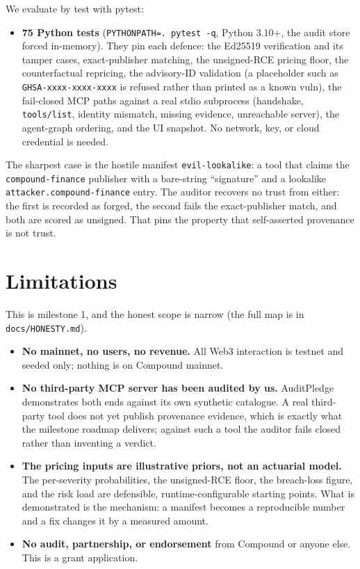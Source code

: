 \documentclass[11pt]{article}
\begin{document}
We evaluate by test with pytest:

\begin{itemize}[leftmargin=1.4em]
\item \textbf{75 Python tests} (\texttt{PYTHONPATH=. pytest -q}, Python 3.10+, the audit store
forced in-memory). They pin each defence: the Ed25519 verification and its tamper cases,
exact-publisher matching, the unsigned-RCE pricing floor, the counterfactual repricing, the
advisory-ID validation (a placeholder such as \texttt{GHSA-xxxx-xxxx-xxxx} is refused rather
than printed as a known vuln), the fail-closed MCP paths against a real stdio subprocess
(handshake, \texttt{tools/list}, identity mismatch, missing evidence, unreachable server), the
agent-graph ordering, and the UI snapshot. No network, key, or cloud credential is needed.
\end{itemize}

The sharpest case is the hostile manifest \texttt{evil-lookalike}: a tool that claims the
\texttt{compound-finance} publisher with a bare-string ``signature'' and a lookalike
\texttt{attacker.compound-finance} entry. The auditor recovers no trust from either: the first
is recorded as forged, the second fails the exact-publisher match, and both are scored as
unsigned. That pins the property that self-asserted provenance is not trust.

\section{Limitations}\label{sec:limits}
This is milestone 1, and the honest scope is narrow (the full map is in
\texttt{docs/HONESTY.md}).
\begin{itemize}[leftmargin=1.4em]
\item \textbf{No mainnet, no users, no revenue.} All Web3 interaction is testnet and seeded
only; nothing is on Compound mainnet.
\item \textbf{No third-party MCP server has been audited by us.} AuditPledge demonstrates both
ends against its own synthetic catalogue. A real third-party tool does not yet publish
provenance evidence, which is exactly what the milestone roadmap delivers; against such a tool
the auditor fails closed rather than inventing a verdict.
\item \textbf{The pricing inputs are illustrative priors, not an actuarial model.} The
per-severity probabilities, the unsigned-RCE floor, the breach-loss figure, and the risk load
are defensible, runtime-configurable starting points. What is demonstrated is the mechanism: a
manifest becomes a reproducible number and a fix changes it by a measured amount.
\item \textbf{No audit, partnership, or endorsement} from Compound or anyone else. This is a
grant application.
\end{itemize}
\end{document}
